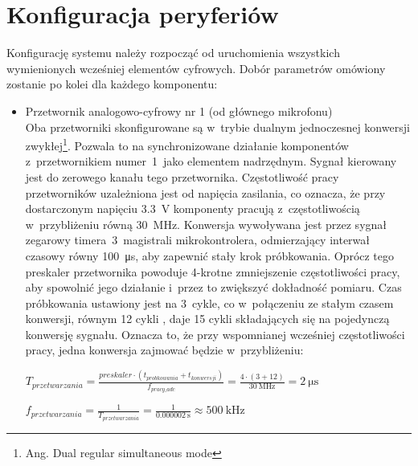 \section{Konfiguracja peryferiów}
\label{sec:configuration}
Konfigurację systemu należy rozpocząć od uruchomienia wszystkich wymienionych wcześniej elementów cyfrowych. Dobór parametrów omówiony zostanie po kolei dla każdego komponentu:
\begin{itemize}
	\item Przetwornik analogowo-cyfrowy nr 1 (od głównego mikrofonu)\\
	Oba przetworniki skonfigurowane są w~trybie dualnym jednoczesnej konwersji zwykłej\footnote{Ang. Dual regular simultaneous mode}. Pozwala to na synchronizowane działanie komponentów z~przetwornikiem numer~1~jako elementem nadrzędnym. Sygnał kierowany jest do zerowego kanału tego przetwornika. Częstotliwość pracy przetworników uzależniona jest od napięcia zasilania, co oznacza, że przy dostarczonym napięciu \SI{3.3}{\V} komponenty pracują z~częstotliwością w~przybliżeniu równą \SI{30}{\MHz}. Konwersja wywoływana jest przez sygnał zegarowy timera~3~magistrali mikrokontrolera, odmierzający interwał czasowy równy \SI{100}{\micro\s}, aby zapewnić stały krok próbkowania. Oprócz tego preskaler przetwornika powoduje 4-krotne zmniejszenie częstotliwości pracy, aby spowolnić jego działanie i~przez to zwiększyć dokładność pomiaru. Czas próbkowania ustawiony jest na 3~cykle, co w~połączeniu ze stałym czasem konwersji, równym 12 cykli \cite{RM0390}, daje 15 cykli składających się na pojedynczą konwersję sygnału. Oznacza to, że przy wspomnianej wcześniej częstotliwości pracy, jedna konwersja zajmować będzie w~przybliżeniu:
		
\begin{center}
		$ T_{przetwarzania} = \frac{preskaler \cdot (t_{probkowania} + t_{konwersji})}{f_{pracy\_adc}} = \frac{4\cdot(3+12)}{\SI{30}{\MHz}} = \SI{2}{\micro\s} $
	
	$ f_{przetwarzania} = \frac{1}{T_{przetwarzania}} = \frac{1}{\SI{0.000002}{\s}} \approx \SI{500}{\kHz} $ 
	

\end{center}
\end{itemize}
